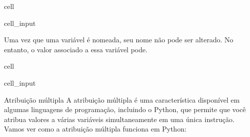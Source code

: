 \documentclass[letterpaper,10pt,english]{jupyterBook}
\begin{document}
\begin{sphinxuseclass}{cell}\begin{sphinxVerbatimInput}

\begin{sphinxuseclass}{cell_input}
\begin{sphinxVerbatim}[commandchars=\\\{\}]
              
                   
         
             
  \PYG{p}{[}   \PYG{p}{]}   
\end{sphinxVerbatim}

\end{sphinxuseclass}\end{sphinxVerbatimInput}

\end{sphinxuseclass}
\sphinxAtStartPar
Uma vez que uma variável é nomeada, seu nome não pode ser alterado. No entanto, o valor associado a essa variável pode.

\begin{sphinxuseclass}{cell}\begin{sphinxVerbatimInput}

\begin{sphinxuseclass}{cell_input}
\begin{sphinxVerbatim}[commandchars=\\\{\}]
    
    
\end{sphinxVerbatim}

\end{sphinxuseclass}\end{sphinxVerbatimInput}

\end{sphinxuseclass}
\sphinxAtStartPar
Atribuição múltipla
A atribuição múltipla é uma característica disponível em algumas linguagens de programação, incluindo o Python, que permite que você atribua valores a várias variáveis simultaneamente em uma única instrução. Vamos ver como a atribuição múltipla funciona em Python:
\end{document}
